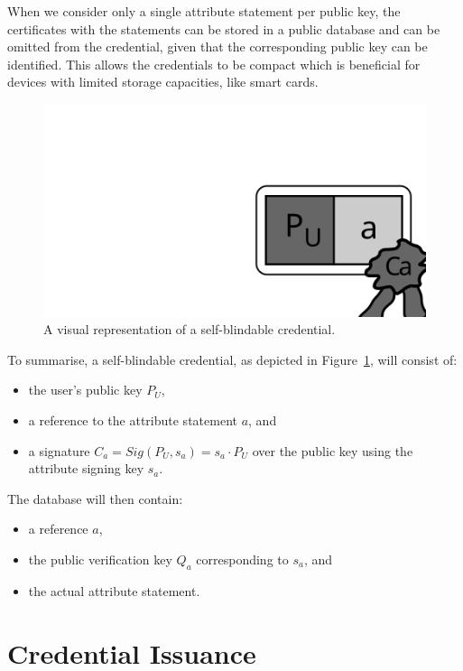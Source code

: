 When we consider only a single attribute statement per public key, the
certificates with the statements can be stored in a public database and can be
omitted from the credential, given that the corresponding public key can be
identified. This allows the credentials to be compact which is beneficial for
devices with limited storage capacities, like smart cards.

\begin{figure}[ht]
  \centering
  \includegraphics[scale=.45]{images/sbc-credential}
  \caption{A visual representation of a self-blindable credential.}
  \label{fig:SBC-credential}
\end{figure}

\noindent To summarise, a self-blindable credential, as depicted in
Figure~\ref{fig:SBC-credential}, will consist of:
\begin{itemize}
  \item the user's public key $P_U$,
  \item a reference to the attribute statement $a$, and
  \item a signature $C_a = Sig(P_U, s_a) = s_a \cdot P_U$ over the public key
    using the attribute signing key $s_a$.
\end{itemize}
The database will then contain:
\begin{itemize}
  \item a reference $a$,
  \item the public verification key $Q_a$ corresponding to $s_a$, and
  \item the actual attribute statement.
\end{itemize}

\section{Credential Issuance}

